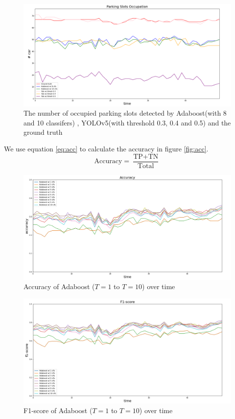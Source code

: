 \documentclass{article}[12pt, twocolumn]
\begin{document}
\begin{figure}[H]
    \centering
    \includegraphics[width=\textwidth]{figure/Parking_Slots_Occupation.png}
    \caption{The number of occupied parking slots detected by Adaboost(with 8 and 10 classifers)
    , YOLOv5(with threshold 0.3, 0.4 and 0.5) and the ground truth}
\end{figure}

We use equation \ref{eq:acc} to calculate the accuracy in figure \ref{fig:acc}.
\begin{equation} 
    \text{Accuracy} = \frac{\text{TP}+\text{TN}}{\text{Total}}
    \label{eq:acc}
\end{equation}



\begin{figure}[H]
    \centering
    \includegraphics[width=\textwidth]{figure/Accuracy_Adaboost.png}
    \caption{Accuracy of Adaboost ($T=1$ to $T=10$) over time}
    \label{fig:acc_ada}
\end{figure}

\begin{figure}[H]
    \centering
    \includegraphics[width=\textwidth]{figure/F1-score_Adaboost.png}
    \caption{F1-score of Adaboost ($T=1$ to $T=10$) over time}
    \label{fig:f1_ada}
\end{figure}
\end{document}
